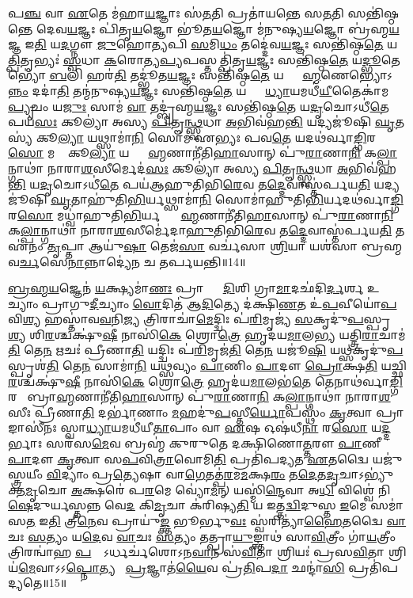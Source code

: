 𑌪\ul{𑌞𑍍𑌚} 𑌵𑌾 \ul{𑌏}𑌤𑍇 𑌮॑𑌹𑌾\ul{𑌯}𑌜𑍍𑌞𑌾𑌃 𑌸॑\ul{𑌤}𑌤𑌿 𑌪𑍍𑌰𑌤𑌾॑𑌯𑌨𑍍𑌤𑍇 𑌸\ul{𑌤}𑌤𑌿 𑌸𑌨𑍍𑌤𑌿॑𑌷𑍍𑌠𑌨𑍍𑌤𑍇 𑌦𑍇𑌵\ul{𑌯}𑌜𑍍𑌞𑌃 𑌪𑌿॑𑌤𑍃\ul{𑌯}𑌜𑍍𑌞𑍋 𑌭𑍂॑𑌤\ul{𑌯}𑌜𑍍𑌞𑍋 𑌮॑𑌨𑍁𑌷𑍍𑌯\ul{𑌯}𑌜𑍍𑌞𑍋 𑌬𑍍𑌰॑𑌹𑍍𑌮\ul{𑌯}𑌜𑍍𑌞 𑌇\ul{𑌤𑌿} 𑌯\ul{𑌦}𑌗𑍍𑌨𑍗 \ul{𑌜𑍁}𑌹𑍋\ul{𑌤𑍍𑌯}𑌪𑌿 \ul{𑌸}𑌮𑌿\ul{𑌧𑌂} 𑌤𑌦𑍍𑌦𑍇॑𑌵\ul{𑌯}𑌜𑍍𑌞𑌃 𑌸𑌨𑍍𑌤𑌿॑𑌷𑍍𑌠\ul{𑌤𑍇} 𑌯\ul{𑌤𑍍𑌪𑌿}𑌤𑍃𑌭𑍍𑌯𑌃॑ \ul{𑌸𑍍𑌵}𑌧𑌾 \ul{𑌕}𑌰𑍋𑌤𑍍𑌯\ul{𑌪𑍍𑌯}𑌪𑌸𑍍𑌤𑌤𑍍𑌪𑌿॑𑌤𑍃\ul{𑌯}𑌜𑍍𑌞𑌃 𑌸𑌨𑍍𑌤𑌿॑𑌷𑍍𑌠\ul{𑌤𑍇} 𑌯\ul{𑌦𑍍𑌭𑍂}𑌤𑍇𑌭𑍍𑌯𑍋॑ \ul{𑌬}𑌲𑌿 𑌹𑌰॑\ul{𑌤𑌿} 𑌤𑌦𑍍𑌭𑍂॑𑌤\ul{𑌯}𑌜𑍍𑌞𑌃 𑌸𑌨𑍍𑌤𑌿॑𑌷𑍍𑌠\ul{𑌤𑍇} 𑌯𑌦𑍍𑌬𑍍𑌰𑌾᳚\ul{𑌹𑍍𑌮}𑌣𑍇𑌭𑍍𑌯𑍋𑌽\ul{𑌨𑍍𑌨𑌂} 𑌦𑌦𑌾॑\ul{𑌤𑌿} 𑌤𑌨𑍍𑌮॑𑌨𑍁𑌷𑍍𑌯\ul{𑌯}𑌜𑍍𑌞𑌃 𑌸𑌨𑍍𑌤𑌿॑𑌷𑍍𑌠\ul{𑌤𑍇} 𑌯𑌥𑍍𑌸𑍍𑌵𑌾᳚\ul{𑌧𑍍𑌯𑌾}𑌯𑌮𑌧𑍀॑\ul{𑌯𑍀}𑌤𑍈𑌕𑌾॑𑌮\ul{𑌪𑍍𑌯𑍃}𑌚𑌂 𑌯\ul{𑌜𑍁𑌃} 𑌸𑌾𑌮॑ \ul{𑌵𑌾} 𑌤𑌦𑍍𑌬𑍍𑌰॑𑌹𑍍𑌮\ul{𑌯}𑌜𑍍𑌞𑌃 𑌸𑌨𑍍𑌤𑌿॑𑌷𑍍𑌠\ul{𑌤𑍇} 𑌯\ul{𑌦𑍃}𑌚𑍋𑌽𑌧𑍀॑\ul{𑌤𑍇} 𑌪𑌯॑\ul{𑌸𑌃} 𑌕𑍂𑌲𑍍𑌯𑌾॑ 𑌅𑌸𑍍𑌯 \ul{𑌪𑌿}𑌤𑍄\ul{𑌨𑍍𑌥𑍍𑌸𑍍𑌵}𑌧𑌾 \ul{𑌅}𑌭𑌿𑌵॑𑌹\ul{𑌨𑍍𑌤𑌿} 𑌯𑌦𑍍𑌯𑌜𑍂॑𑌷𑌿 \ul{𑌘𑍃}𑌤𑌸𑍍𑌯॑ 𑌕𑍂\ul{𑌲𑍍𑌯𑌾} 𑌯𑌥𑍍𑌸𑌾𑌮𑌾॑\ul{𑌨𑌿} 𑌸𑍋𑌮॑ 𑌏𑌭𑍍𑌯𑌃 𑌪𑌵\ul{𑌤𑍇} 𑌯𑌦𑌥॑𑌰𑍍𑌵𑌾\ul{𑌙𑍍𑌗𑌿}𑌰\ul{𑌸𑍋} 𑌮𑌧𑍋𑌃᳚ 𑌕𑍂\ul{𑌲𑍍𑌯𑌾} 𑌯𑌦𑍍𑌬𑍍𑌰𑌾᳚\ul{𑌹𑍍𑌮}𑌣𑌾𑌨𑍀॑𑌤𑌿\ul{𑌹𑌾}𑌸𑌾𑌨𑍍 𑌪𑍁॑\ul{𑌰𑌾}𑌣𑌾\ul{𑌨𑌿} 𑌕\ul{𑌲𑍍𑌪𑌾}𑌨𑍍𑌗𑌾𑌥𑌾॑ 𑌨𑌾𑌰𑌾\ul{𑌶}\ul{}𑌸𑍀𑌰𑍍𑌮𑍇𑌦॑\ul{𑌸𑌃} 𑌕𑍂𑌲𑍍𑌯𑌾॑ 𑌅𑌸𑍍𑌯 \ul{𑌪𑌿}𑌤𑍄\ul{𑌨𑍍𑌥𑍍𑌸𑍍𑌵}𑌧𑌾 \ul{𑌅}𑌭𑌿𑌵॑𑌹\ul{𑌨𑍍𑌤𑌿} 𑌯\ul{𑌦𑍃}𑌚𑍋𑌽𑌧𑍀॑\ul{𑌤𑍇} 𑌪𑌯॑𑌆𑌹𑍁𑌤𑌿𑌭𑌿\ul{𑌰𑍇}𑌵 𑌤\ul{𑌦𑍍𑌦𑍇}𑌵𑌾𑌸𑍍𑌤॑𑌰𑍍𑌪𑌯\ul{𑌤𑌿} 𑌯𑌦𑍍𑌯𑌜𑍂॑𑌷𑌿 \ul{𑌘𑍃}𑌤𑌾𑌹𑍁॑𑌤𑌿\ul{𑌭𑌿}𑌰𑍍𑌯𑌥𑍍𑌸𑌾𑌮𑌾॑\ul{𑌨𑌿} 𑌸𑍋𑌮𑌾॑𑌹𑍁𑌤𑌿\ul{𑌭𑌿}𑌰𑍍𑌯𑌦𑌥॑𑌰𑍍𑌵𑌾\ul{𑌙𑍍𑌗𑌿}𑌰\ul{𑌸𑍋} 𑌮𑌧𑍍𑌵𑌾॑\-𑌹𑍁𑌤𑌿\ul{𑌭𑌿}𑌰𑍍𑌯𑌦𑍍𑌬𑍍𑌰𑌾᳚\ul{𑌹𑍍𑌮}𑌣𑌾𑌨𑍀॑𑌤𑌿\ul{𑌹𑌾}𑌸𑌾𑌨𑍍 𑌪𑍁॑\ul{𑌰𑌾}𑌣𑌾\ul{𑌨𑌿} 𑌕\ul{𑌲𑍍𑌪𑌾}𑌨𑍍𑌗𑌾𑌥𑌾॑ 𑌨𑌾𑌰𑌾\ul{𑌶}\ul{}𑌸𑍀𑌰𑍍𑌮𑍇॑𑌦𑌾\ul{𑌹𑍁}𑌤𑌿𑌭𑌿॑\ul{𑌰𑍇}𑌵 𑌤\ul{𑌦𑍍𑌦𑍇}𑌵𑌾𑌸𑍍𑌤॑𑌰𑍍𑌪𑌯\ul{𑌤𑌿} 𑌤 𑌏॑𑌨𑌂 \ul{𑌤𑍃}𑌪𑍍𑌤𑌾 𑌆𑌯𑍁॑\ul{𑌷𑌾} 𑌤𑍇𑌜॑\ul{𑌸𑌾} 𑌵𑌰𑍍𑌚॑𑌸𑌾 \ul{𑌶𑍍𑌰𑌿}𑌯𑌾 𑌯𑌶॑𑌸𑌾 𑌬𑍍𑌰𑌹𑍍𑌮𑌵\ul{𑌰𑍍𑌚}𑌸𑍇\ul{𑌨𑌾}𑌨𑍍𑌨𑌾𑌦𑍍𑌯𑍇॑𑌨 𑌚 𑌤𑌰𑍍𑌪𑌯𑌨𑍍𑌤𑌿॥14॥
\anuvakamend


\ul{𑌬𑍍𑌰}\ul{𑌹𑍍𑌮}\ul{𑌯}𑌜𑍍𑌞𑍇𑌨॑ \ul{𑌯}𑌕𑍍𑌷𑍍𑌯𑌮𑌾॑\ul{𑌣𑌃} 𑌪𑍍𑌰𑌾𑌚𑍍𑌯𑌾𑌂᳚ \ul{𑌦𑌿}𑌶𑌿 𑌗𑍍𑌰𑌾\ul{𑌮𑌾}𑌦𑌛॑𑌦𑌿\ul{𑌰𑍍𑌦}𑌰𑍍\mbox{}𑌶 𑌉𑌦𑍀᳚𑌚𑍍𑌯𑌾𑌂 𑌪𑍍𑌰𑌾𑌗𑍁\ul{𑌦𑍀}𑌚𑍍𑌯𑌾𑌂 \ul{𑌵𑍋}𑌦𑌿𑌤॑ 𑌆\ul{𑌦𑌿}𑌤𑍍𑌯𑍇 𑌦॑𑌕𑍍𑌷𑌿\ul{𑌣}𑌤 𑌉॑\ul{𑌪}𑌵𑍀𑌯𑍋॑\ul{𑌪}𑌵𑌿\ul{𑌶𑍍𑌯} 𑌹𑌸𑍍𑌤𑌾॑𑌵\ul{𑌵}𑌨𑌿\ul{𑌜𑍍𑌯} 𑌤𑍍𑌰𑌿𑌰𑌾𑌚𑌾॑\ul{𑌮𑍇}𑌦𑍍𑌦𑍍𑌵𑌿𑌃 𑌪॑\ul{𑌰𑌿}𑌮𑍃𑌜𑍍𑌯॑ \ul{𑌸}𑌕𑍃𑌦𑍁॑\ul{𑌪}𑌸𑍍𑌪𑍃\ul{𑌶𑍍𑌯} 𑌶𑌿\ul{𑌰}𑌶𑍍𑌚𑌕𑍍𑌷𑍁॑\ul{𑌷𑍀} 𑌨𑌾𑌸𑌿॑\ul{𑌕𑍇} 𑌶𑍍𑌰𑍋\ul{𑌤𑍍𑌰𑍇} 𑌹𑍃𑌦॑𑌯\ul{𑌮𑌾}𑌲\ul{𑌭𑍍𑌯} 𑌯𑌤𑍍𑌤𑍍𑌰𑌿\ul{𑌰𑌾}𑌚𑌾𑌮॑\ul{𑌤𑌿} 𑌤𑍇\ul{𑌨} 𑌋𑌚𑌃॑ 𑌪𑍍𑌰𑍀𑌣𑌾\ul{𑌤𑌿} 𑌯𑌦𑍍𑌦𑍍𑌵𑌿𑌃 𑌪॑\ul{𑌰𑌿}𑌮𑍃𑌜॑\ul{𑌤𑌿} 𑌤𑍇\ul{𑌨} 𑌯𑌜𑍂॑\ul{𑌷𑌿} 𑌯\ul{𑌥𑍍𑌸}𑌕𑍃𑌦𑍁॑\ul{𑌪}𑌸𑍍𑌪𑍃𑌶॑\ul{𑌤𑌿} 𑌤𑍇\ul{𑌨} 𑌸𑌾𑌮𑌾॑\ul{𑌨𑌿} 𑌯\ul{𑌥𑍍𑌸}𑌵𑍍𑌯𑌂 \ul{𑌪𑌾}𑌣𑌿𑌂 \ul{𑌪𑌾}𑌦𑍗 \ul{𑌪𑍍𑌰𑍋}𑌕𑍍𑌷\ul{𑌤𑌿} 𑌯𑌚𑍍𑌛𑌿\ul{𑌰}𑌶𑍍𑌚𑌕𑍍𑌷𑍁॑\ul{𑌷𑍀} 𑌨𑌾𑌸𑌿॑\ul{𑌕𑍇} 𑌶𑍍𑌰𑍋\ul{𑌤𑍍𑌰𑍇} 𑌹𑍃𑌦॑𑌯\ul{𑌮𑌾}𑌲𑌭॑\ul{𑌤𑍇} 𑌤𑍇𑌨𑌾𑌥॑𑌰𑍍𑌵𑌾\ul{𑌙𑍍𑌗𑌿}𑌰𑌸𑍋᳚ 𑌬𑍍𑌰𑌾\ul{𑌹𑍍𑌮}𑌣𑌾𑌨𑍀॑𑌤𑌿\ul{𑌹𑌾}𑌸𑌾𑌨𑍍 𑌪𑍁॑\ul{𑌰𑌾}𑌣𑌾\ul{𑌨𑌿} 𑌕\ul{𑌲𑍍𑌪𑌾}𑌨𑍍𑌗𑌾𑌥𑌾॑ 𑌨𑌾𑌰𑌾\ul{𑌶}\ul{}𑌸𑍀𑌃 𑌪𑍍𑌰𑍀॑𑌣𑌾\ul{𑌤𑌿} 𑌦𑌰𑍍𑌭𑌾॑𑌣𑌾𑌂 \ul{𑌮}𑌹𑌦𑍁॑\ul{𑌪}𑌸𑍍𑌤𑍀\ul{𑌰𑍍𑌯𑍋}𑌪𑌸𑍍𑌥𑌂॑ \ul{𑌕𑍃}𑌤𑍍𑌵𑌾 𑌪𑍍𑌰𑌾𑌙𑌾𑌸𑍀॑𑌨𑌃 𑌸𑍍𑌵𑌾\ul{𑌧𑍍𑌯𑌾}𑌯𑌮𑌧𑍀॑𑌯𑍀\ul{𑌤𑌾}𑌪𑌾𑌂 𑌵𑌾 \ul{𑌏}𑌷 𑌓𑌷॑𑌧𑍀\ul{𑌨𑌾}\ul{} 𑌰\ul{𑌸𑍋} 𑌯\ul{𑌦𑍍𑌦}𑌰𑍍𑌭𑌾𑌃 𑌸𑌰॑𑌸\ul{𑌮𑍇}𑌵 𑌬𑍍𑌰𑌹𑍍𑌮॑ 𑌕𑍁𑌰𑍁𑌤𑍇 𑌦𑌕𑍍𑌷𑌿𑌣𑍋\ul{𑌤𑍍𑌤}𑌰𑍗 \ul{𑌪𑌾}𑌣𑍀 \ul{𑌪𑌾}𑌦𑍗 \ul{𑌕𑍃}𑌤𑍍𑌵𑌾 𑌸\ul{𑌪}𑌵𑌿\ul{𑌤𑍍𑌰𑌾}𑌵𑍋𑌮𑌿\ul{𑌤𑌿} 𑌪𑍍𑌰𑌤𑌿॑𑌪𑌦𑍍𑌯𑌤 \ul{𑌏}𑌤𑌦𑍍𑌵𑍈 𑌯𑌜𑍁॑𑌸𑍍𑌤𑍍𑌰𑌯𑍀𑌂 \ul{𑌵𑌿}𑌦𑍍𑌯𑌾𑌂 𑌪𑍍𑌰\ul{𑌤𑍍𑌯𑍇}𑌷𑌾 𑌵𑌾\ul{𑌗𑍇}𑌤𑌤𑍍𑌪॑\ul{𑌰}𑌮\ul{𑌮}𑌕𑍍𑌷\ul{𑌰𑌂} 𑌤\ul{𑌦𑍇}𑌤\ul{𑌦𑍃}𑌚𑌾𑌽𑌭𑍍𑌯𑍁॑𑌕𑍍𑌤\ul{𑌮𑍃}𑌚𑍋 \ul{𑌅}𑌕𑍍𑌷𑌰𑍇॑ 𑌪\ul{𑌰}𑌮𑍇 𑌵𑍍𑌯𑍋॑\ul{𑌮}𑌨𑍍 𑌯𑌸𑍍𑌮𑌿॑\ul{𑌨𑍍𑌦𑍇}𑌵𑌾 𑌅\ul{𑌧𑌿} 𑌵𑌿𑌶𑍍𑌵𑍇॑ 𑌨𑌿\ul{𑌷𑍇}𑌦𑍁𑌰𑍍𑌯𑌸𑍍𑌤𑌨𑍍𑌨 𑌵𑍇\ul{𑌦} 𑌕𑌿\ul{𑌮𑍃}𑌚𑌾 𑌕॑𑌰𑌿𑌷𑍍𑌯\ul{𑌤𑌿} 𑌯 𑌇𑌤𑍍𑌤\ul{𑌦𑍍𑌵𑌿}𑌦𑍁𑌸𑍍𑌤 \ul{𑌇}𑌮𑍇 𑌸𑌮𑌾॑𑌸\ul{𑌤} 𑌇\ul{𑌤𑌿} 𑌤𑍍𑌰𑍀\ul{𑌨𑍇}𑌵 𑌪𑍍𑌰𑌾𑌯𑍁॑\ul{𑌙𑍍𑌕𑍍𑌤} 𑌭𑍂𑌰𑍍𑌭𑍁\ul{𑌵𑌃} 𑌸𑍍𑌵॑𑌰𑌿𑌤𑍍𑌯𑌾॑\ul{𑌹𑍈}𑌤𑌦𑍍𑌵𑍈 \ul{𑌵𑌾}𑌚𑌃 \ul{𑌸}𑌤𑍍𑌯𑌂 𑌯\ul{𑌦𑍇}𑌵 \ul{𑌵𑌾}𑌚𑌃 \ul{𑌸}𑌤𑍍𑌯𑌂 𑌤𑌤𑍍𑌪𑍍𑌰𑌾\ul{𑌯𑍁}𑌙𑍍𑌕𑍍𑌤𑌾𑌥॑ 𑌸𑌾\ul{𑌵𑌿}𑌤𑍍𑌰𑍀𑌂 𑌗𑌾॑\ul{𑌯}𑌤𑍍𑌰𑍀𑌂 𑌤𑍍𑌰𑌿𑌰𑌨𑍍𑌵𑌾॑𑌹 \ul{𑌪}𑌚𑍍𑌛𑍋᳚𑌽𑌰𑍍𑌧𑌰𑍍𑌚॑𑌶𑍋𑌽𑌨\ul{𑌵𑌾}𑌨 𑌸॑\ul{𑌵𑌿}𑌤𑌾 𑌶𑍍𑌰𑌿𑌯𑌃॑ 𑌪𑍍𑌰𑌸\ul{𑌵𑌿}𑌤𑌾 𑌶𑍍𑌰𑌿𑌯॑\ul{𑌮𑍇}𑌵𑌾𑌽𑌽\ul{𑌪𑍍𑌨𑍋}𑌤𑍍𑌯𑌥𑍋᳚ \ul{𑌪𑍍𑌰}𑌜𑍍𑌞𑌾𑌤॑\ul{𑌯𑍈}𑌵 𑌪𑍍𑌰॑\ul{𑌤𑌿}𑌪\ul{𑌦𑌾} 𑌛𑌨𑍍𑌦𑌾॑\ul{𑌸𑌿} 𑌪𑍍𑌰𑌤𑌿॑𑌪𑌦𑍍𑌯𑌤𑍇॥15॥\anuvakamend


